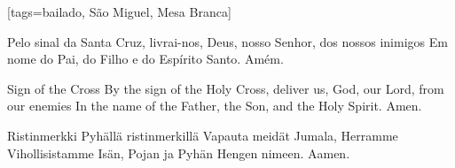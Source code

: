 [tags={bailado, São Miguel, Mesa Branca}]
  \begin{passage}[PT]{}\obeylines
    Pelo sinal da Santa Cruz,
    livrai-nos, Deus, nosso Senhor,
    dos nossos inimigos
    \polpar
    Em nome do Pai, do Filho e do Espírito Santo.
    \polpar
    Amém.
  \end{passage}
  \begin{passage}[EN]{Sign of the Cross}\obeylines
    By the sign of the Holy Cross,
    deliver us, God, our Lord,
    from our enemies
    \polpar
    In the name of the Father, the Son, and the Holy Spirit.
    \polpar
    Amen.
  \end{passage}
  \begin{passage}[FI]{Ristinmerkki}\obeylines
    Pyhällä ristinmerkillä
    Vapauta meidät Jumala, Herramme
    Vihollisistamme
    \polpar
    Isän, Pojan ja Pyhän Hengen nimeen.
    \polpar
    Aamen.
  \end{passage}
  \vspace*{\fill}
\endsong
